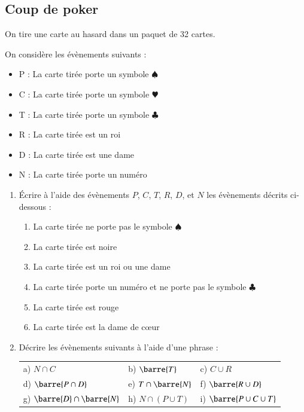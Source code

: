 \documentclass[oneside,12pt]{article}          %
\begin{document}
\subsection{Coup de poker}
On tire une carte au hasard dans un paquet de 32 cartes.

On considère les évènements suivants :
\begin{itemize}[label=$\bullet$]
    \item P : \og La carte tirée porte un symbole $\spadesuit$ \fg
    \item C : \og La carte tirée porte un symbole \textcolor{newred}{\large $\varheartsuit$} \fg
    \item T : \og La carte tirée porte un symbole $\clubsuit$ \fg
    \item R : \og La carte tirée est un roi \fg
    \item D : \og La carte tirée est une dame \fg
    \item N : \og La carte tirée porte un numéro \fg
\end{itemize} \vspace{-2mm}
\begin{enumerate}
    \item Écrire à l'aide des évènements $P$, $C$, $T$, $R$, $D$, et $N$ les évènements décrits ci-dessous :
    \begin{enumerate}
        \item \og La carte tirée ne porte pas le symbole $\spadesuit$ \fg
        \item \og La carte tirée est noire \fg
        \item \og La carte tirée est un roi ou une dame \fg
        \item \og La carte tirée porte un numéro et ne porte pas le symbole $\clubsuit$ \fg
        \item \og La carte tirée est rouge \fg
        \item \og La carte tirée est la dame de cœur \fg
    \end{enumerate}
\item Décrire les évènements suivants à l'aide d'une phrase : \\
    \renewcommand{\arraystretch}{1.25}
    \begin{tabular}{p{} p{} p{}}
         a) $N\cap C$ & b) $\barre{T}$ & c) $C\cup R $ \\
         d) $\barre{P\cap D}$ & e) $T\cap\barre{N}$ & f) $\barre{R\cup D}$ \\
         g) $\barre{D}\cap\barre{N}$ & h) $N \cap (P \cup T)$ & i) $\barre{P\cup C\cup T}$ 
    \end{tabular}
\end{enumerate}
\end{document}
